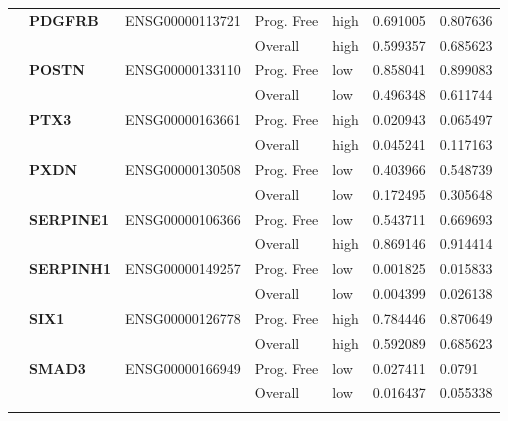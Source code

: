 \begin{spacing}{1}
{\begin{longtable}{%
            |>{\bfseries}p{2cm}|
            >{\bfseries}p{1.9cm}|
            >{\tiny}p{1.9cm}|
            p{2cm}|
            p{2cm}|
            p{1.5cm}|
            p{1.5cm}|
            }
            \hhline{~======}
             & PDGFRB   & ENSG00000113721 & Prog. Free & high & 0.691005 & 0.807636 \\
            \hhline{~~~----}
             &          &                 & Overall    & high & 0.599357 & 0.685623 \\
            \hhline{~======}
             & POSTN    & ENSG00000133110 & Prog. Free & low  & 0.858041 & 0.899083 \\
            \hhline{~~~----}
             &          &                 & Overall    & low  & 0.496348 & 0.611744 \\
            \hhline{~======}
             & PTX3     & ENSG00000163661 & Prog. Free & high & 0.020943 & 0.065497 \\
            \hhline{~~~----}
             &          &                 & Overall    & high & 0.045241 & 0.117163 \\
            \hhline{~======}
             & PXDN     & ENSG00000130508 & Prog. Free & low  & 0.403966 & 0.548739 \\
            \hhline{~~~----}
             &          &                 & Overall    & low  & 0.172495 & 0.305648 \\
            \hhline{~======}
             & SERPINE1 & ENSG00000106366 & Prog. Free & low  & 0.543711 & 0.669693 \\
            \hhline{~~~----}
             &          &                 & Overall    & high & 0.869146 & 0.914414 \\
            \hhline{~======}
             & SERPINH1 & ENSG00000149257 & Prog. Free & low  & 0.001825 & 0.015833 \\
            \hhline{~~~----}
             &          &                 & Overall    & low  & 0.004399 & 0.026138 \\
            \hhline{~======}
             & SIX1     & ENSG00000126778 & Prog. Free & high & 0.784446 & 0.870649 \\
            \hhline{~~~----}
             &          &                 & Overall    & high & 0.592089 & 0.685623 \\
            \hhline{~======}
             & SMAD3    & ENSG00000166949 & Prog. Free & low  & 0.027411 & 0.0791   \\
            \hhline{~~~----}
             &          &                 & Overall    & low  & 0.016437 & 0.055338 \\
            \hhline{~======}

\end{longtable}}
\end{spacing}

